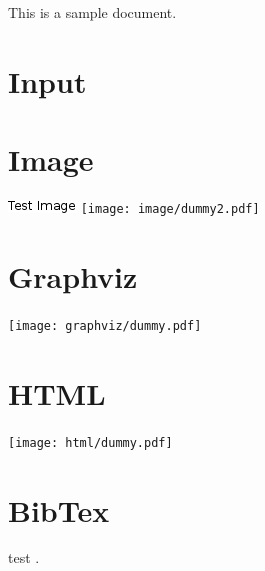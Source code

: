 This is a sample document.

\section{Input}



\section{Image}
\includegraphics{image/dummy1.png}
\texttt{[image: image/dummy2.pdf]}

\section{Graphviz}
\texttt{[image: graphviz/dummy.pdf]}

\section{HTML}
\texttt{[image: html/dummy.pdf]}

\section{BibTex}
test \cite{lamport1985i1}.




